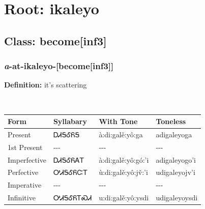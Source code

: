 \needspace{4in}
\section*{Root: ikaleyo}
\nopagebreak
{}
\needspace{3in}
\subsection*{Class: become[inf3]}
\nopagebreak
\needspace{2in}
\subsubsection*{\textit{a}{-}at{-}\textbf{ikaleyo}{-}[become[inf3]]}
\nopagebreak
\textbf{Definition: } it{\textquoteright}s scattering
\\[0.5em]
\begin{tabularx}{\textwidth}{l X X X}%
\toprule%
\textbf{Form}&\textbf{Syllabary}&\textbf{With Tone}&\textbf{Toneless}\\%
\midrule%
Present&ᎠᏗᎦᎴᏲᎦ&à:di:galě:yô:ga&adigaleyoga\\%
1st Present&{-}{-}{-}&{-}{-}{-}&{-}{-}{-}\\%
Imperfective&ᎠᏗᎦᎴᏲᎪᎢ&à:di:galě:yô:gó:’i&adigaleyogo’i\\%
Perfective&ᎤᏗᎦᎴᏲᏨᎢ&ù:di:galě:yô:jv̌:’i&udigaleyojv’i\\%
Imperative&{-}{-}{-}&{-}{-}{-}&{-}{-}{-}\\%
Infinitive&ᎤᏗᎦᎴᏲᎢᏍᏗ&u:di:galě:yô:ysdi&udigaleyoysdi\\%
\bottomrule%
\end{tabularx}
\\[1em]